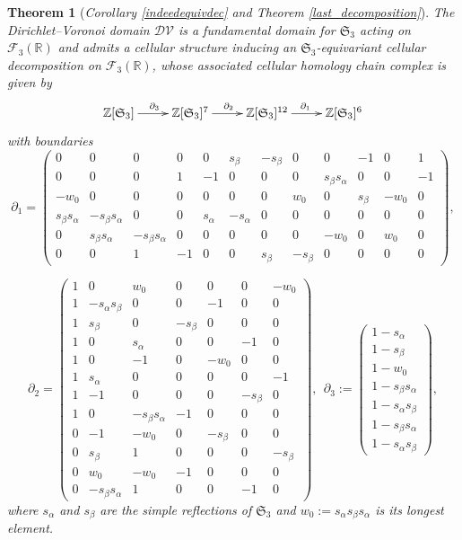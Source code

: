 \documentclass[11pt,twoside]{amsart}
\theoremstyle{plain}
\newtheorem*{theo*}{Theorem}
\newcommand{\R}{{\mathbb R}}
\newcommand{\Z}{{\mathbb Z}}
\newcommand{\Sym}{\mathfrak{S}}
\begin{document}
\begin{theo*}[\emph{Corollary \ref{indeedequivdec} and Theorem \ref{last_decomposition}}]
The Dirichlet--Voronoi domain $\mathcal{DV}$ is a fundamental domain for $\Sym_3$ acting on $\mathcal{F}_3(\R)$ and admits a cellular structure inducing an $\Sym_3$-equivariant cellular decomposition on $\mathcal{F}_3(\R)$, whose associated cellular homology chain complex is given by
\[\xymatrix{\Z[\Sym_3] \ar^{\partial_3}[r] & \Z[\Sym_3]^7 \ar^{\partial_2}[r] & \Z[\Sym_3]^{12} \ar^{\partial_1}[r] & \Z[\Sym_3]^6}\]
with boundaries
\[\partial_1=\left(\begin{smallmatrix}0 & 0 & 0 & 0 & 0 & s_\beta & -s_\beta & 0 & 0 & -1 & 0 & 1 \\ 0 & 0 & 0 & 1 & -1 & 0 & 0 & 0 & s_{\beta}s_\alpha & 0 & 0 & -1 \\ -w_0 & 0 & 0 & 0 & 0 & 0 & 0 & w_0 & 0 & s_\beta & -w_0 & 0 \\ s_\beta s_\alpha & -s_\beta s_\alpha & 0 & 0 & s_\alpha & -s_\alpha & 0 & 0 & 0 & 0 & 0 & 0 \\ 0 & s_\beta s_\alpha & -s_\beta s_\alpha & 0 & 0 & 0 & 0 & 0 & -w_0 & 0 & w_0 & 0 \\ 0 & 0 & 1 & -1 & 0 & 0 & s_\beta & -s_\beta & 0 & 0 & 0 & 0\end{smallmatrix}\right),\]

\[\partial_2=\left(\begin{smallmatrix}
1 & 0 & w_0 & 0 & 0 & 0 & -w_0 \\
1 & -s_\alpha s_\beta & 0 & 0 & -1 & 0 & 0 \\
1 & s_\beta & 0 & -s_\beta & 0 & 0 & 0 \\
1 & 0 & s_\alpha & 0 & 0 & -1 & 0 \\
1 & 0 & -1 & 0 & -w_0 & 0 & 0 \\
1 & s_\alpha & 0 & 0 & 0 & 0 & -1 \\
1 & -1 & 0 & 0 & 0 & -s_\beta & 0 \\
1 & 0 & -s_\beta s_\alpha & -1 & 0 & 0 & 0 \\
0 & -1 & -w_0 & 0 & -s_\beta & 0 & 0 \\
0 & s_\beta & 1 & 0 & 0 & 0 & -s_\beta \\
0 & w_0 & -w_0 & -1 & 0 & 0 & 0 \\
0 & -s_\beta s_\alpha & 1 & 0 & 0 & -1 & 0\end{smallmatrix}\right),~~
\partial_3:=\left(\begin{smallmatrix}
1-s_\alpha \\
1-s_\beta \\
1-w_0 \\
1-s_\beta s_\alpha \\
1-s_\alpha s_\beta \\
1-s_\beta s_\alpha \\
1-s_\alpha s_\beta\end{smallmatrix}\right),\]
where $s_\alpha$ and $s_\beta$ are the simple reflections of $\Sym_3$ and $w_0:=s_\alpha s_\beta s_\alpha$ is its longest element.
\end{theo*}
\end{document}
